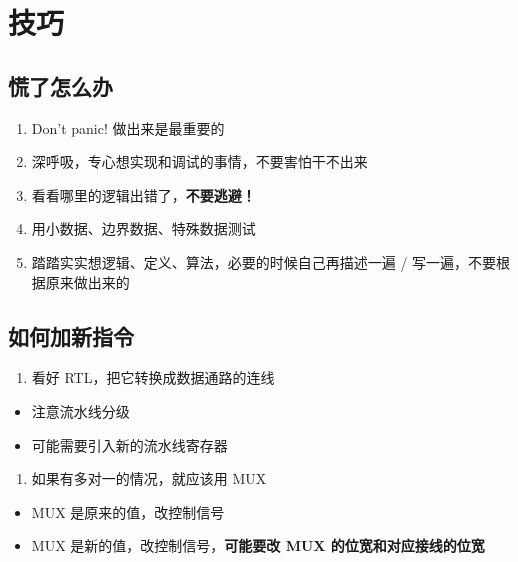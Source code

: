 \documentclass[12pt,AutoFakeBold,AutoFakeSlant]{article}
\providecommand{\tightlist}{%
  \setlength{\itemsep}{0pt}\setlength{\parskip}{0pt}}
\begin{document}
\hypertarget{ux6280ux5de7}{%
\section{技巧}\label{ux6280ux5de7}}

\hypertarget{ux614cux4e86ux600eux4e48ux529e}{%
\subsection{慌了怎么办}\label{ux614cux4e86ux600eux4e48ux529e}}

\begin{enumerate}
\def\labelenumi{\arabic{enumi}.}
\tightlist
\item
  Don't panic! 做出来是最重要的
\item
  深呼吸，专心想实现和调试的事情，不要害怕干不出来
\item
  看看哪里的逻辑出错了，\textbf{不要逃避！}
\item
  用小数据、边界数据、特殊数据测试
\item
  踏踏实实想逻辑、定义、算法，必要的时候自己再描述一遍 /
  写一遍，不要根据原来做出来的
\end{enumerate}

\hypertarget{ux5982ux4f55ux52a0ux65b0ux6307ux4ee4}{%
\subsection{如何加新指令}\label{ux5982ux4f55ux52a0ux65b0ux6307ux4ee4}}

\begin{enumerate}
\def\labelenumi{\arabic{enumi}.}
\tightlist
\item
  看好 RTL，把它转换成数据通路的连线
\end{enumerate}

\begin{itemize}
\tightlist
\item
  注意流水线分级
\item
  可能需要引入新的流水线寄存器
\end{itemize}

\begin{enumerate}
\def\labelenumi{\arabic{enumi}.}
\setcounter{enumi}{1}
\tightlist
\item
  如果有多对一的情况，就应该用 MUX
\end{enumerate}

\begin{itemize}
\tightlist
\item
  MUX 是原来的值，改控制信号
\item
  MUX 是新的值，改控制信号，\textbf{可能要改 MUX 的位宽和对应接线的位宽}
\end{itemize}
\end{document}
